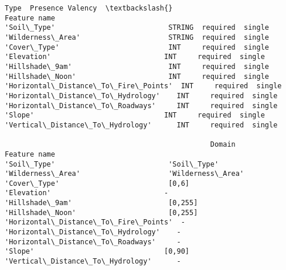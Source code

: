 \documentclass[11pt]{article}
\begin{document}
    
    \begin{Verbatim}[commandchars=\\\{\}]
                                        Type  Presence Valency  \textbackslash{}
Feature name                                                     
'Soil\_Type'                           STRING  required  single   
'Wilderness\_Area'                     STRING  required  single   
'Cover\_Type'                          INT     required  single   
'Elevation'                           INT     required  single   
'Hillshade\_9am'                       INT     required  single   
'Hillshade\_Noon'                      INT     required  single   
'Horizontal\_Distance\_To\_Fire\_Points'  INT     required  single   
'Horizontal\_Distance\_To\_Hydrology'    INT     required  single   
'Horizontal\_Distance\_To\_Roadways'     INT     required  single   
'Slope'                               INT     required  single   
'Vertical\_Distance\_To\_Hydrology'      INT     required  single   

                                                 Domain  
Feature name                                             
'Soil\_Type'                           'Soil\_Type'        
'Wilderness\_Area'                     'Wilderness\_Area'  
'Cover\_Type'                          [0,6]              
'Elevation'                           -                  
'Hillshade\_9am'                       [0,255]            
'Hillshade\_Noon'                      [0,255]            
'Horizontal\_Distance\_To\_Fire\_Points'  -                  
'Horizontal\_Distance\_To\_Hydrology'    -                  
'Horizontal\_Distance\_To\_Roadways'     -                  
'Slope'                               [0,90]             
'Vertical\_Distance\_To\_Hydrology'      -                  
    \end{Verbatim}

    
    
\end{document}
